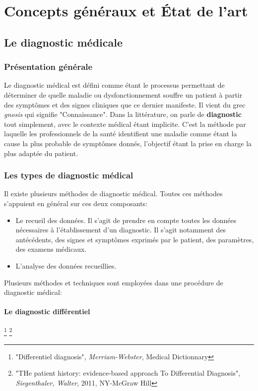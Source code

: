 
\chapter{Concepts généraux et État de l'art}
\label{chp:etat_art}


\section{Le diagnostic médicale}

\subsection{Présentation générale}
Le diagnostic médical est défini comme étant le processus permettant de déterminer de quelle maladie ou dysfonctionnement souffre un patient à partir des symptômes et des signes cliniques que ce dernier manifeste. Il vient du grec \textit{gnosis} qui signifie "Connaissance".
Dans la littérature, on parle de \textbf{diagnostic} tout simplement, avec le contexte médical étant implicite.
C'est la méthode par laquelle les professionnels de la santé identifient une maladie comme étant la cause la plus probable de symptômes donnés, l'objectif étant la prise en charge la plus adaptée du patient.


\subsection{Les types de diagnostic médical}
Il existe plusieurs méthodes de diagnostic médical. Toutes ces méthodes s'appuient en général sur ces deux composants:
\begin{itemize}
    \item Le recueil des données. Il s'agit de prendre en compte toutes les données nécessaires à l'établissement d'un diagnostic. Il s'agit notamment des antécédents, des signes et symptômes exprimés par le patient, des paramètres, des examens médicaux.
    \item L'analyse des données recueillies.\end{itemize}

Plusieurs méthodes et techniques sont employées dans une procédure de diagnostic médical:

\subsubsection{Le diagnostic différentiel} \footnote{"Differentiel diagnosis", \textit{Merriam-Webster}, Medical Dictionnary} \footnote{"THe patient history: evidence-based approach To Differential Diagnosis", \textit{Siegenthaler, Walter}, 2011, NY-McGraw Hill}

